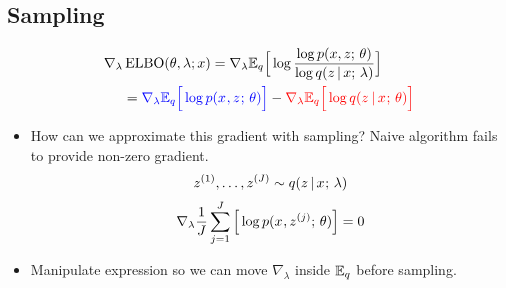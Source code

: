 




\subsection{Sampling}


\begin{frame}
\begin{align*}
    \nabla_\lambda &\operatorname*{ELBO}(\theta, \lambda ; x) =  \nabla_\lambda \mathbb{E}_q \Big[\log \frac{\log p(x, z ; \, \theta)}{\log q (z \,|\, x ; \, \lambda)} \Big]\\
    &= {\color{blue} \nabla_\lambda {\mathbb{E}_{ q}\Big[ \log p(x^{}, z^{} ; \,\theta) \Big]}} - {\color{red} \nabla_\lambda \mathbb{E}_{ q}\Big[ \log q( z^{} \,|\, x^{} ; \, \theta) \Big]}  
\end{align*} 
\pause
\begin{itemize}
    \item How can we approximate this gradient with sampling?  Naive algorithm fails to provide non-zero gradient.
    \[ z^{(1)}, \dots, z^{(J)} \sim q(z \,|\, x^{} ; \, \lambda) \]
 \[ \nabla_\lambda \frac{1}{J} \sum_{j=1}^J \Big[ \log p(x^{}, z^{(j)} ; \, \theta) \Big] = 0\]
    \item Manipulate expression so we can move $\nabla_\lambda$ inside $\mathbb{E}_q$ before sampling.
\end{itemize}
\end{frame}



